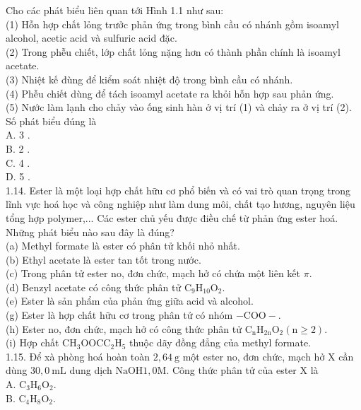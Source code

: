 \documentclass[10pt]{article}
\begin{document}
Cho các phát biểu liên quan tới Hình 1.1 như sau:\\
(1) Hỗn hợp chất lỏng trưởc phản ứng trong bình cầu có nhánh gồm isoamyl alcohol, acetic acid và sulfuric acid đặc.\\
(2) Trong phễu chiết, lớp chất lỏng nặng hơn có thành phần chính là isoamyl acetate.\\
(3) Nhiệt kế đùng để kiểm soát nhiệt độ trong bình cầu có nhánh.\\
(4) Phễu chiết dùng để tách isoamyl acetate ra khỏi hỗn hợp sau phản ứng.\\
(5) Nước làm lạnh cho chảy vào ống sinh hàn ở vị trí (1) và chảy ra ở vị trí (2). Số phát biểu đúng là\\
A. 3 .\\
B. 2 .\\
C. 4 .\\
D. 5 .\\
1.14. Ester là một loại hợp chất hữu cơ phổ biến và có vai trò quan trọng trong lĩnh vực hoá học và công nghiệp như làm dung môi, chất tạo hương, nguyên liệu tổng hợp polymer,... Các ester chủ yếu được điều chế từ phản ứng ester hoá. Những phát biểu nào sau đây là đúng?\\
(a) Methyl formate là ester có phân tử khối nhỏ nhất.\\
(b) Ethyl acetate là ester tan tốt trong nước.\\
(c) Trong phân tử ester no, đơn chức, mạch hở có chứa một liên kết $\pi$.\\
(d) Benzyl acetate có công thức phân tử $\mathrm{C}_{9} \mathrm{H}_{10} \mathrm{O}_{2}$.\\
(e) Ester là sản phẩm của phản ứng giữa acid và alcohol.\\
(g) Ester là hợp chất hữu cơ trong phân tử có nhóm $-\mathrm{COO}-$.\\
(h) Ester no, đơn chức, mạch hở có công thức phân tử $\mathrm{C}_{\mathrm{n}} \mathrm{H}_{2 \mathrm{n}} \mathrm{O}_{2}(\mathrm{n} \geq 2)$.\\
(i) Hợp chất $\mathrm{CH}_{3} \mathrm{OOCC}_{2} \mathrm{H}_{5}$ thuộc dãy đồng đẳng của methyl formate.\\
1.15. Để xà phòng hoá hoàn toàn $2,64 \mathrm{~g}$ một ester no, đơn chức, mạch hở X cần dùng $30,0 \mathrm{~mL}$ dung dịch $\mathrm{NaOH} 1,0 \mathrm{M}$. Công thức phân tử của ester X là\\
A. $\mathrm{C}_{3} \mathrm{H}_{6} \mathrm{O}_{2}$.\\
B. $\mathrm{C}_{4} \mathrm{H}_{8} \mathrm{O}_{2}$.\\
\end{document}
